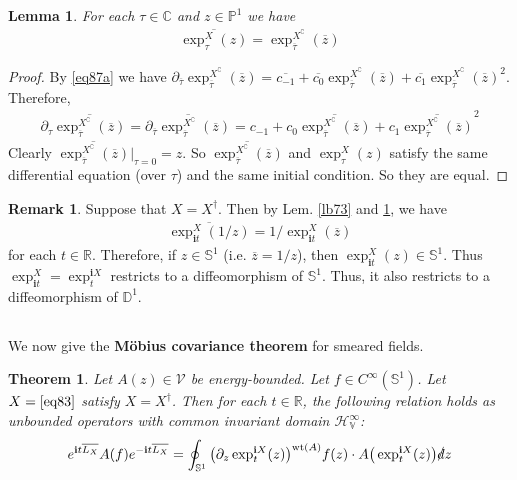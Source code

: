 \documentclass[12pt,b5paper,notitlepage]{article}
\theoremstyle{definition}
\newtheorem{rem}[df]{Remark}
\theoremstyle{plain}
\newtheorem{thm}[df]{Theorem}
\newtheorem{lm}[df]{Lemma}
\newcommand{\mc}{\mathcal}
\newcommand{\ovl}{\overline}
\newcommand{\im}{\mathbf{i}}
\newcommand{\Co}{\complement}
\newcommand{\Cbb}{\mathbb C}
\newcommand{\Pbb}{\mathbb P}
\newcommand{\Rbb}{\mathbb R}
\newcommand{\Dbb}{\mathbb D}
\newcommand{\wt}{\mathrm{wt}}
\newcommand{\Sbb}{{\mathbb S}}
\newcommand{\HV}{\mathcal H_{\mathbb V}}
\newcommand{\ointn}{\oint\nolimits}
\newcommand{\sd}{\slashed{d}}
\numberwithin{equation}{section}
\begin{document}
\begin{lm}\label{lbb5}
For each $\tau\in\Cbb$ and $z\in\Pbb^1$ we have
\begin{align}
\ovl{\exp^X_\tau(z)}=\exp^{X^\Co}_{\ovl\tau}(\ovl z)
\end{align}
\end{lm}
\begin{proof}
By \eqref{eq87a} we have $\partial_{\ovl\tau}\exp^{X^\Co}_{\ovl\tau}(\ovl z)=\ovl{c_{-1}}+\ovl{c_0}\exp^{X^\Co}_{\ovl\tau}(\ovl z)+\ovl{c_1}\exp^{X^\Co}_{\ovl\tau}(\ovl z)^2$. Therefore, 
\begin{align*}
\partial_\tau \ovl{\exp^{X^\Co}_{\ovl\tau}(\ovl z)}=\ovl{\partial_{\ovl\tau}\exp^{X^\Co}_{\ovl\tau}(\ovl z)}=c_{-1}+c_0\ovl{\exp^{X^\Co}_{\ovl\tau}(\ovl z)}+c_1\ovl{\exp^{X^\Co}_{\ovl\tau}(\ovl z)}^2
\end{align*}
Clearly $\ovl{\exp^{X^\Co}_{\ovl\tau}(\ovl z)}\Big|_{\tau=0}=z$. So $\ovl{\exp^{X^\Co}_{\ovl\tau}(\ovl z)}$ and $\exp^X_\tau(z)$ satisfy the same differential equation (over $\tau$) and the same initial condition. So they are equal.
\end{proof}


\begin{rem}\label{lb74}
Suppose that $X=X^\dagger$. Then by Lem. \ref{lb73} and \ref{lbb5}, we have
\begin{align*}
\ovl{\exp^X_{\im t}(1/z)}=1/\exp^X_{\im t}(\ovl z)
\end{align*}
for each $t\in\Rbb$. Therefore, if $z\in\Sbb^1$ (i.e. $\ovl z=1/z$), then $\exp_{\im t}^X(z)\in\Sbb^1$. Thus $\exp_{\im t}^X=\exp^{\im X}_t$ restricts to a diffeomorphism of $\Sbb^1$. Thus, it also restricts to a diffeomorphism of $\Dbb^1$.
\end{rem}



\subsection{}

We now give the \textbf{M\"obius covariance theorem} for smeared fields.

\begin{thm}\label{lb65}
Let $A(z)\in\mc V$ be energy-bounded. Let $f\in C^\infty(\Sbb^1)$. Let $X=\eqref{eq83}$ satisfy $X=X^\dagger$. Then for each $t\in\Rbb$, the following relation holds as unbounded operators with common invariant domain $\HV^\infty$:
\begin{align}\label{eq86}
e^{\im t\ovl{L_X}} A(f)e^{-\im t\ovl{L_X}}=\ointn_{\Sbb^1} \big(\partial_z\exp^{\im X}_t(z)\big)^{\wt(A)}f(z)\cdot A\big(\exp^{\im X}_t(z)\big)\sd z
\end{align}
\end{thm}
\end{document}
